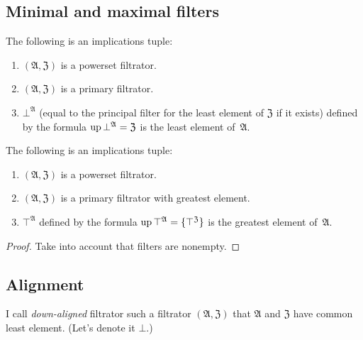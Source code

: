 \subsection{Minimal and maximal filters}
\begin{obvious}
The following is an implications tuple:
\begin{enumerate}
\item $(\mathfrak{A},\mathfrak{Z})$ is a powerset filtrator.
\item $(\mathfrak{A},\mathfrak{Z})$ is a primary filtrator.
\item $\bot^{\mathfrak{A}}$ (equal to the principal filter for the least
element of $\mathfrak{Z}$ if it exists) defined by the formula $\operatorname{up}\bot^{\mathfrak{A}}=\mathfrak{Z}$
is the least element of~$\mathfrak{A}$.
\end{enumerate}
\end{obvious}
\begin{prop}
The following is an implications tuple:
\begin{enumerate}
\item $(\mathfrak{A},\mathfrak{Z})$ is a powerset filtrator.
\item $(\mathfrak{A},\mathfrak{Z})$ is a primary filtrator with greatest
element.
\item $\top^{\mathfrak{A}}$ defined by the formula $\operatorname{up}\top^{\mathfrak{A}}=\{\top^{\mathfrak{Z}}\}$
is the greatest element of~$\mathfrak{A}$.
\end{enumerate}
\end{prop}
\begin{proof}
Take into account that filters are nonempty.
\end{proof}

\subsection{Alignment}
\begin{defn}
I call \emph{down-aligned} filtrator
such a filtrator $(\mathfrak{A},\mathfrak{Z})$ that $\mathfrak{A}$
and $\mathfrak{Z}$ have common least element. (Let's denote it $\bot$.)
\end{defn}

